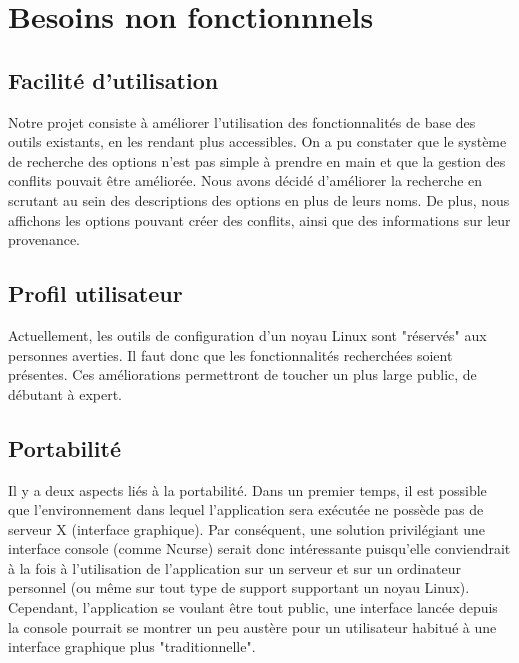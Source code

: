\documentclass[16pts]{report}
\begin{document}
\chapter{Besoins non fonctionnnels}
\label{cha:Besoins non fonctionnnels}

\section{Facilité d'utilisation}
\label{sec:Facilité d'utilisation}

Notre projet consiste à améliorer l'utilisation des fonctionnalités de base des
outils existants, en les rendant plus accessibles. On a pu constater que le
système de recherche des options n'est pas simple à prendre en main et que la
gestion des conflits pouvait être améliorée.
Nous avons décidé d'améliorer la recherche en scrutant au sein des descriptions
des options en plus de leurs noms. De plus, nous affichons les options pouvant
créer des conflits, ainsi que des informations sur leur provenance.


\section{Profil utilisateur}
\label{sec:Profil utilisateur}

Actuellement, les outils de configuration d'un noyau Linux sont "réservés" aux
personnes averties. Il faut donc que les fonctionnalités recherchées soient
présentes. Ces améliorations permettront de toucher un plus large public, de
débutant à expert.


\section{Portabilité}
\label{sec:Portabilité}

Il y a deux aspects liés à la portabilité.
Dans un premier temps, il est possible que l'environnement dans lequel
l'application sera exécutée ne possède pas de serveur X (interface graphique).
Par conséquent, une solution privilégiant une interface console (comme Ncurse)
serait donc intéressante puisqu'elle conviendrait à la fois à l'utilisation de
l'application sur un serveur et sur un ordinateur personnel (ou même sur tout
type de support supportant un noyau Linux). Cependant, l'application se voulant
être tout public, une interface lancée depuis la console pourrait se montrer un
peu austère pour un utilisateur habitué à une interface graphique plus
"traditionnelle".
\end{document}
